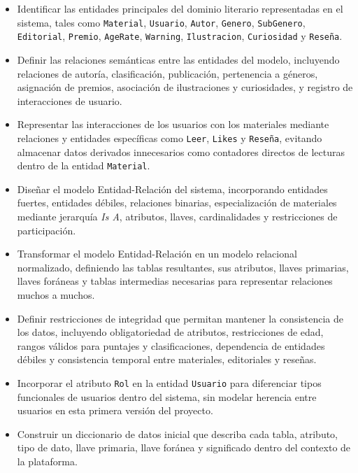 \documentclass[12pt,a4paper]{article}
\begin{document}
\begin{itemize}
    \item Identificar las entidades principales del dominio literario representadas en el sistema, tales como \texttt{Material}, \texttt{Usuario}, \texttt{Autor}, \texttt{Genero}, \texttt{SubGenero}, \texttt{Editorial}, \texttt{Premio}, \texttt{AgeRate}, \texttt{Warning}, \texttt{Ilustracion}, \texttt{Curiosidad} y \texttt{Reseña}.

    \item Definir las relaciones semánticas entre las entidades del modelo, incluyendo relaciones de autoría, clasificación, publicación, pertenencia a géneros, asignación de premios, asociación de ilustraciones y curiosidades, y registro de interacciones de usuario.

    \item Representar las interacciones de los usuarios con los materiales mediante relaciones y entidades específicas como \texttt{Leer}, \texttt{Likes} y \texttt{Reseña}, evitando almacenar datos derivados innecesarios como contadores directos de lecturas dentro de la entidad \texttt{Material}.

    \item Diseñar el modelo Entidad-Relación del sistema, incorporando entidades fuertes, entidades débiles, relaciones binarias, especialización de materiales mediante jerarquía \textit{Is A}, atributos, llaves, cardinalidades y restricciones de participación.

    \item Transformar el modelo Entidad-Relación en un modelo relacional normalizado, definiendo las tablas resultantes, sus atributos, llaves primarias, llaves foráneas y tablas intermedias necesarias para representar relaciones muchos a muchos.

    \item Definir restricciones de integridad que permitan mantener la consistencia de los datos, incluyendo obligatoriedad de atributos, restricciones de edad, rangos válidos para puntajes y clasificaciones, dependencia de entidades débiles y consistencia temporal entre materiales, editoriales y reseñas.

    \item Incorporar el atributo \texttt{Rol} en la entidad \texttt{Usuario} para diferenciar tipos funcionales de usuarios dentro del sistema, sin modelar herencia entre usuarios en esta primera versión del proyecto.

    \item Construir un diccionario de datos inicial que describa cada tabla, atributo, tipo de dato, llave primaria, llave foránea y significado dentro del contexto de la plataforma.


\end{itemize}
\end{document}
